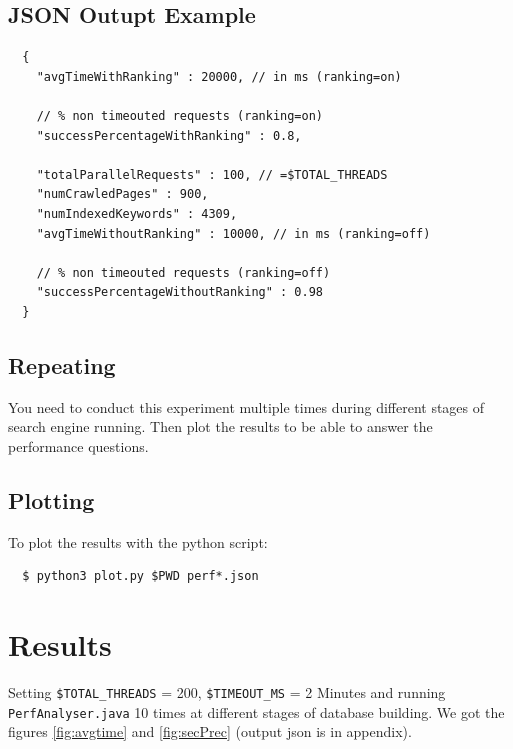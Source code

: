 \documentclass[12pt]{article}
\begin{document}
\subsection{JSON Outupt Example}
\begin{verbatim}
  {
    "avgTimeWithRanking" : 20000, // in ms (ranking=on)

    // % non timeouted requests (ranking=on)
    "successPercentageWithRanking" : 0.8, 

    "totalParallelRequests" : 100, // =$TOTAL_THREADS
    "numCrawledPages" : 900,
    "numIndexedKeywords" : 4309,
    "avgTimeWithoutRanking" : 10000, // in ms (ranking=off)

    // % non timeouted requests (ranking=off)
    "successPercentageWithoutRanking" : 0.98 
  }
\end{verbatim}

\subsection{Repeating}
You need to conduct this experiment multiple times during different stages of search engine running. Then plot the results to be able to answer the performance questions.

\subsection{Plotting}
To plot the results with the python script:
\begin{verbatim}
  $ python3 plot.py $PWD perf*.json
\end{verbatim}

\section{Results}
Setting \texttt{\$TOTAL\_THREADS} = 200, \texttt{\$TIMEOUT\_MS} = 2 Minutes and running \texttt{PerfAnalyser.java} 10 times at different stages of database building.
We got the figures \ref{fig:avgtime} and \ref{fig:secPrec} (output json is in appendix).
\end{document}

